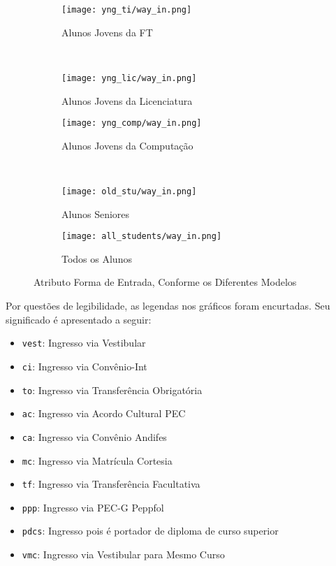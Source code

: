 \clearpage
\begin{figure}[!ht]
    \centering
    \begin{subfigure}[b]{0.48\textwidth}
        \centering
        \texttt{[image: yng\_ti/way\_in.png]}
        \caption{Alunos Jovens da FT}
    \end{subfigure}
    ~
    \begin{subfigure}[b]{0.48\textwidth}
        \centering
        \texttt{[image: yng\_lic/way\_in.png]}
        \caption{Alunos Jovens da Licenciatura}
    \end{subfigure}

    \begin{subfigure}[b]{0.48\textwidth}
        \centering
        \texttt{[image: yng\_comp/way\_in.png]}
        \caption{Alunos Jovens da Computação}
    \end{subfigure}
    ~
    \begin{subfigure}[b]{0.48\textwidth}
        \centering
        \texttt{[image: old\_stu/way\_in.png]}
        \caption{Alunos Seniores}
    \end{subfigure}

    \begin{subfigure}[b]{0.48\textwidth}
        \centering
        \texttt{[image: all\_students/way\_in.png]}
        \caption{Todos os Alunos}
    \end{subfigure}
    \caption{Atributo Forma de Entrada, Conforme os Diferentes Modelos}
\end{figure}

Por questões de legibilidade, as legendas nos gráficos foram encurtadas. Seu significado é
apresentado a seguir: 
\begin{itemize}
    \item \texttt{vest}: Ingresso via Vestibular
    \item \texttt{ci}: Ingresso via Convênio-Int
    \item \texttt{to}: Ingresso via Transferência Obrigatória
    \item \texttt{ac}: Ingresso via Acordo Cultural PEC
    \item \texttt{ca}: Ingresso via Convênio Andifes
    \item \texttt{mc}: Ingresso via Matrícula Cortesia
    \item \texttt{tf}: Ingresso via Transferência Facultativa
    \item \texttt{ppp}: Ingresso via PEC-G Peppfol
    \item \texttt{pdcs}: Ingresso pois é portador de diploma de curso superior
    \item \texttt{vmc}: Ingresso via Vestibular para Mesmo Curso
\end{itemize}

